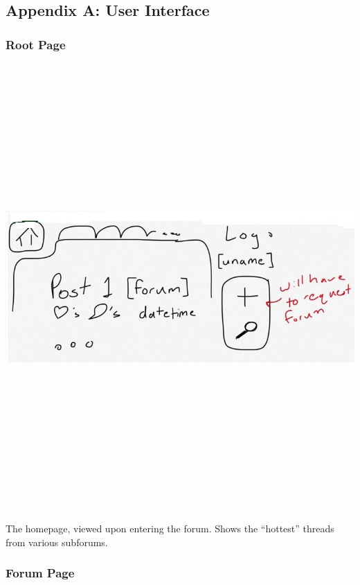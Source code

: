 \documentclass[12pt]{scrartcl}
\begin{document}
\subsection{Appendix A: User Interface}

\subsubsection{Root Page}

\includegraphics[width=17cm, height=17cm, keepaspectratio]{homepage.jpg}

The homepage, viewed upon entering the forum. Shows the “hottest” threads from various subforums.

\subsubsection{Forum Page}
\end{document}

